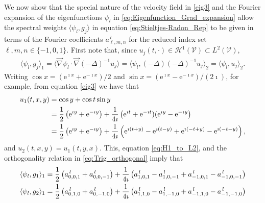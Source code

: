 \documentclass{article}
\newcommand{\e}{\mathrm{e}}
\newcommand{\Hc}{\mathcal{H}}
\newcommand{\Vc}{\mathcal{V}}
\newcommand{\0}{\mathbf{0}}
\newcommand{\1}{\mathbf{1}}
\newcommand{\2}{\mathbf{2}}
\newcommand{\3}{\mathbf{3}}
\newcommand{\4}{\mathbf{4}}
\newcommand{\5}{\mathbf{5}}
\newcommand{\6}{\mathbf{6}}
\newcommand{\7}{\mathbf{7}}
\newcommand{\8}{\mathbf{8}}
\begin{document}
We now show that the special nature of the velocity field in
\eqref{eig3} and the Fourier expansion of the eigenfunctions $\psi_l$ in  
\eqref{eq:Eigenfunction_Grad_expansion} allow the spectral weights
$\langle\psi_l,g_j\rangle$ in equation \eqref{eq:Stieltjes-Radon_Rep} to be given in
terms of the Fourier coefficients $a^{\,l}_{\ell,m,n}$ for the reduced
index set $\ell,m,n\in\{-1,0,1\}$. First note that, since
$u_j(t,\cdot)\in\Hc^1(\Vc)\subset L^2(\Vc)$,
%
\begin{align}\label{eq:H1_to_L2}
  \langle\psi_l,g_j\rangle_1=\langle\vec{\nabla}\psi_l\cdot\vec{\nabla}(-\Delta)^{-1}u_j\rangle
         =\langle\psi_l,(-\Delta)(-\Delta)^{-1}u_j\rangle_2
         =\langle\psi_l,u_j\rangle_2.
\end{align}
%
Writing
$\cos{x}=(\e^{\imath x}+\e^{-\imath x})/2$ and
$\sin{x}=(\e^{\imath x}-\e^{-\imath x})/(2\imath)$, for example, from equation
\eqref{eig3} we have that 
%
\begin{align}
  u_1(t,x,y)&=\cos{y}+\cos{t}\sin{y}\\
           &=\frac{1}{2}\left(\e^{\imath y}+\e^{-\imath y}\right)
            +\frac{1}{4\imath}\left(\e^{\imath t}+\e^{-\imath t})(\e^{\imath y}-\e^{-\imath y}\right)
            \notag\\
           &=\frac{1}{2}\left(\e^{\imath y}+\e^{-\imath y}\right)
            +\frac{1}{4\imath}\left(\e^{\imath(t+y)}-\e^{\imath(t-y)}+\e^{\imath(-t+y)}-\e^{\imath(-t-y)}\right), 
\end{align}
%
and $u_2(t,x,y)=u_1(t,y,x)$. This, equation \eqref{eq:H1_to_L2}, and the
orthogonality relation in \eqref{eq:Trig_orthogonal} imply that
%
\begin{align}\label{eq:Inner_Products_2D}
  \langle\psi_l,g_1\rangle_1=\frac{1}{2}\left(a^{\,l}_{0,0,1}+a^{\,l}_{0,0,-1}\right)
               +\frac{1}{4\imath}\left(a^{\,l}_{1,0,1}-a^{\,l}_{1,0,-1}+a^{\,l}_{-1,0,1}-a^{\,l}_{-1,0,-1}\right) 
               \notag\\
  \langle\psi_l,g_2\rangle_1=\frac{1}{2}\left(a^{\,l}_{0,1,0}+a^{\,l}_{0,-1,0}\right)
               +\frac{1}{4\imath}\left(a^{\,l}_{1,1,0}-a^{\,l}_{1,-1,0}+a^{\,l}_{-1,1,0}-a^{\,l}_{-1,-1,0}\right)               
\end{align}
%
\end{document}
